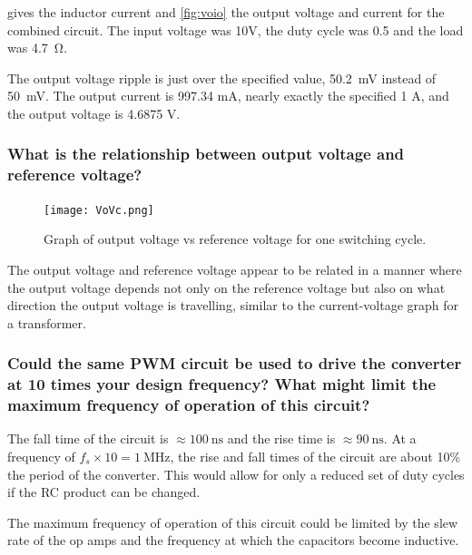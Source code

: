  gives the inductor current and \cref{fig:voio} the output voltage and current for the combined circuit. The input voltage was 10V, the duty cycle was 0.5 and the load was \SI{4.7}{\ohm}.

The output voltage ripple is just over the specified value, \SI{50.2}{\milli\volt} instead of \SI{50}{\milli\volt}. The output current is 997.34 mA, nearly exactly the specified 1 A, and the output voltage is 4.6875 V.


\subsubsection{What is the relationship between output voltage and reference voltage?}
\begin{figure}
	\centering
	\texttt{[image: VoVc.png]}
	\caption{Graph of output voltage vs reference voltage for one switching cycle.}
	\label{fig:vovc}
\end{figure}
The output voltage and reference voltage appear to be related in a manner where the output voltage depends not only on the reference voltage but also on what direction the output voltage is travelling, similar to the current-voltage graph for a transformer.
\subsubsection{Could the same PWM circuit be used to drive the converter at 10 times your design frequency? What might limit the maximum frequency of operation of this circuit?}

The fall time of the circuit is $\approx\SI{100}{\nano\second}$ and the rise time is $\approx\SI{90}{\nano\second}$. At a frequency of $f_s\times 10=\SI{1}{\mega\hertz}$, the rise and fall times of the circuit are about 10\% the period of the converter. This would allow for only a reduced set of duty cycles if the RC product can be changed.

The maximum frequency of operation of this circuit could be limited by the slew rate of the op amps and the frequency at which the capacitors become inductive.